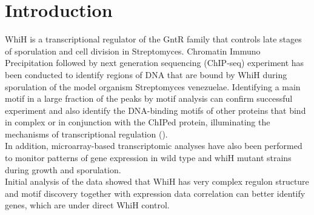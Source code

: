 \documentclass{bioinfo}
\begin{document}
\section{Introduction}

WhiH is a transcriptional regulator of the GntR family that controls late stages of sporulation and cell division in Streptomyces. Chromatin Immuno Precipitation followed by next generation sequencing (ChIP-seq) experiment has been conducted to identify regions of DNA that are bound by WhiH during sporulation of the model organism Streptomyces venezuelae. Identifying a main motif in a large fraction of the peaks by motif analysis can confirm successful experiment and also identify the DNA-binding motifs of other proteins that bind in complex or in conjunction with the ChIPed protein, illuminating the mechanisms of transcriptional regulation (\citealp{MEME}).\\
In addition, microarray-based transcriptomic analyses have also been performed to monitor patterns of gene expression in wild type and whiH mutant strains during growth and sporulation.\\
Initial analysis of the data showed that WhiH has very complex regulon structure and motif discovery together with expression data correlation can better identify genes, which are under direct WhiH control.
\end{document}
